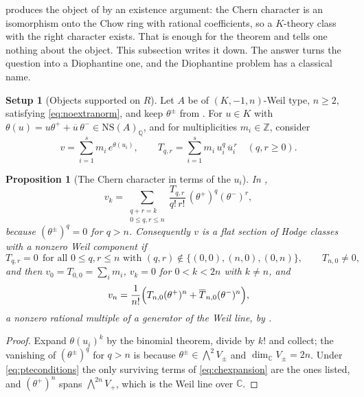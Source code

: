 \documentclass[11pt,reqno]{amsart}
\theoremstyle{plain}
\newtheorem{proposition}[theorem]{Proposition}
\theoremstyle{definition}
\newtheorem{setupenv}[theorem]{Setup}
\theoremstyle{remark}
\newcommand{\QQ}{\mathbb{Q}}
\newcommand{\ZZ}{\mathbb{Z}}
\newcommand{\CC}{\mathbb{C}}
\newcommand{\NS}{\mathrm{NS}}
\newcommand{\bbar}[1]{\overline{#1}}
\begin{document}
 produces the object of  by an
existence argument: the Chern character is an isomorphism onto the Chow ring
with rational coefficients, so a $K$-theory class with the right character
exists. That is enough for the theorem and tells one nothing about the object.
This subsection writes it down. The answer turns the question into a
Diophantine one, and the Diophantine problem has a classical name.

\begin{setupenv}[Objects supported on $R$]\label{setup:pte}
Let $A$ be of $(K,-1,n)$-Weil type, $n\ge2$, satisfying
\eqref{eq:noextranorm}, and keep $\theta^{\pm}$ from
. For $u\in K$ with $\theta(u)=u\theta^{+}+\bbar
u\,\theta^{-}\in\NS(A)_{\QQ}$, and for multiplicities $m_{i}\in\ZZ$, consider
\[
  v=\sum_{i=1}^{s}m_{i}\,e^{\theta(u_{i})},
  \qquad
  T_{q,r}=\sum_{i=1}^{s}m_{i}\,u_{i}^{q}\,\bbar u_{i}^{\,r}
  \quad (q,r\ge0).
\]
\end{setupenv}

\begin{proposition}[The Chern character in terms of the $u_{i}$]
\label{prop:chintermsofu}
In ,
\begin{equation}\label{eq:chexpansion}
  v_{k}
  =\sum_{\substack{q+r=k\\ 0\le q,r\le n}}
    \frac{T_{q,r}}{q!\,r!}\,(\theta^{+})^{q}(\theta^{-})^{r},
\end{equation}
because $(\theta^{\pm})^{q}=0$ for $q>n$. Consequently $v$ is a flat section
of Hodge classes with a nonzero Weil component if
\begin{equation}\label{eq:pteconditions}
  T_{q,r}=0\ \ \text{for all } 0\le q,r\le n \text{ with }
  (q,r)\notin\{(0,0),(n,0),(0,n)\},
  \qquad T_{n,0}\ne0,
\end{equation}
and then $v_{0}=T_{0,0}=\sum_{i}m_{i}$, $v_{k}=0$ for $0<k<2n$ with $k\ne n$,
and
\[
  v_{n}=\frac{1}{n!}\Bigl(T_{n,0}(\theta^{+})^{n}
        +\bbar{T}_{n,0}(\theta^{-})^{n}\Bigr),
\]
a nonzero rational multiple of a generator of the Weil line, by
\cite[Theorem~15.2]{paperI}.
\end{proposition}

\begin{proof}
Expand $\theta(u_{i})^{k}$ by the binomial theorem, divide by $k!$ and collect;
the vanishing of $(\theta^{\pm})^{q}$ for $q>n$ is because
$\theta^{\pm}\in\bigwedge^{2}V_{\pm}$ and $\dim_{\CC}V_{\pm}=2n$. Under
\eqref{eq:pteconditions} the only surviving terms of \eqref{eq:chexpansion}
are the ones listed, and $(\theta^{+})^{n}$ spans $\bigwedge^{2n}V_{+}$, which
is the Weil line over $\CC$.
\end{proof}
\end{document}
